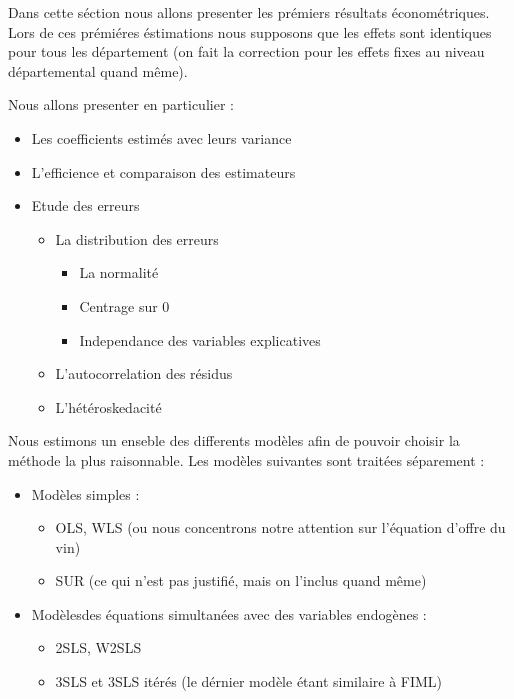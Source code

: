 \documentclass[11pt,]{article}
\providecommand{\tightlist}{%
  \setlength{\itemsep}{0pt}\setlength{\parskip}{0pt}}
\begin{document}
Dans cette séction nous allons presenter les prémiers résultats
économétriques. Lors de ces prémiéres éstimations nous supposons que les
effets sont identiques pour tous les département (on fait la correction
pour les effets fixes au niveau départemental quand même).

\par

Nous allons presenter en particulier :

\begin{itemize}
\tightlist
\item
  Les coefficients estimés avec leurs variance
\item
  L'efficience et comparaison des estimateurs
\item
  Etude des erreurs

  \begin{itemize}
  \tightlist
  \item
    La distribution des erreurs

    \begin{itemize}
    \tightlist
    \item
      La normalité
    \item
      Centrage sur 0
    \item
      Independance des variables explicatives
    \end{itemize}
  \item
    L'autocorrelation des résidus
  \item
    L'hétéroskedacité
  \end{itemize}
\end{itemize}

Nous estimons un enseble des differents modèles afin de pouvoir choisir
la méthode la plus raisonnable. Les modèles suivantes sont traitées
séparement :

\begin{itemize}
\tightlist
\item
  Modèles simples :

  \begin{itemize}
  \tightlist
  \item
    OLS, WLS (ou nous concentrons notre attention sur l'équation d'offre
    du vin)
  \item
    SUR (ce qui n'est pas justifié, mais on l'inclus quand même)
  \end{itemize}
\item
  Modèlesdes équations simultanées avec des variables endogènes :

  \begin{itemize}
  \tightlist
  \item
    2SLS, W2SLS
  \item
    3SLS et 3SLS itérés (le dérnier modèle étant similaire à FIML)
  \end{itemize}
\end{itemize}
\end{document}
